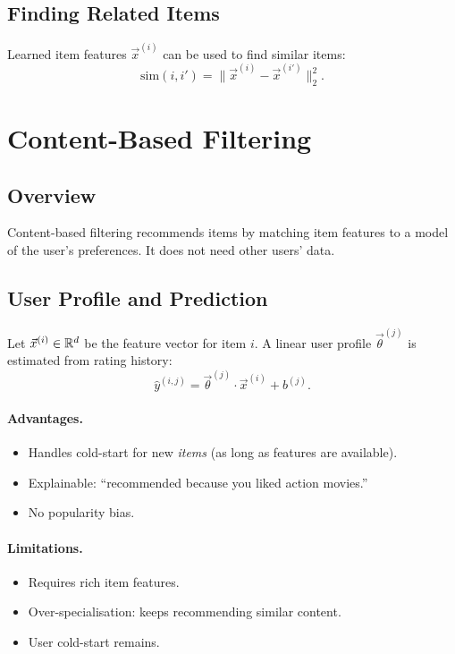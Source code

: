 \subsection{Finding Related Items}

Learned item features $\vec{x}^{(i)}$ can be used to find similar items:
\[\mathrm{sim}(i,i')=\|\vec{x}^{(i)}-\vec{x}^{(i')}\|_2^2.\]

\section{Content-Based Filtering}
\label{sec:cbf}

\subsection{Overview}

Content-based filtering recommends items by matching item features to a model
of the user's preferences. It does not need other users' data.

\subsection{User Profile and Prediction}

Let $\vec{x}^{(i)}\in\mathbb{R}^d$ be the feature vector for item $i$. A linear user
profile $\vec{\theta}^{(j)}$ is estimated from rating history:
\[\hat{y}^{(i,j)}=\vec{\theta}^{(j)}\cdot\vec{x}^{(i)}+b^{(j)}.\]

\paragraph{Advantages.}
\begin{itemize}
\item Handles cold-start for new \emph{items} (as long as features are available).
\item Explainable: ``recommended because you liked action movies.''
\item No popularity bias.
\end{itemize}

\paragraph{Limitations.}
\begin{itemize}
\item Requires rich item features.
\item Over-specialisation: keeps recommending similar content.
\item User cold-start remains.
\end{itemize}


